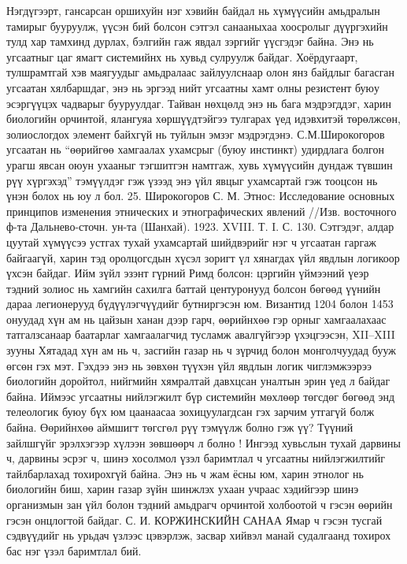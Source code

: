 Нэгдүгээрт, гансарсан оршихуйн нэг хэвийн байдал нь хүмүүсийн амьдралын тамирыг бууруулж, үүсэн бий болсон сэтгэл санааныхаа хоосролыг дүүргэхийн тулд хар тамхинд дурлах, бэлгийн гаж явдал зэргийг үүсгэдэг байна. Энэ нь угсаатныг цаг ямагт системийнх нь хувьд сулруулж байдаг. Хоёрдугаарт, тулшрамтгай хэв маягуудыг амьдралаас зайлуулснаар олон янз байдлыг багасган угсаатан хялбаршдаг, энэ нь эргээд нийт угсаатны хамт олны резистент буюу эсэргүүцэх чадварыг бууруулдаг. Тайван нөхцөлд энэ нь бага мэдрэгддэг, харин биологийн орчинтой, ялангуяа хөршүүдтэйгээ тулгарах үед идэвхитэй төрөлжсөн, золиослогдох элемент байхгүй нь туйлын эмзэг мэдрэгдэнэ. С.М.Широкогоров угсаатан нь “өөрийгөө хамгаалах ухамсрыг (буюу инстинкт) удирдлага болгон урагш явсан оюун ухааныг тэгшитгэн намтгаж, хувь хүмүүсийн дундаж түвшин рүү хүргэхэд” тэмүүлдэг гэж үзээд энэ үйл явцыг ухамсартай гэж тооцсон нь үнэн болох нь юу л бол. 25. Широкогоров С. М. Этнос: Исследование основных принципов изменения этнических и этнографических явлений //Изв. восточного ф-та Дальнево-сточн. ун-та (Шанхай). 1923. XVIII. Т. I. С. 130.
Сэтгэдэг, алдар цуутай хүмүүсээ устгах тухай ухамсартай шийдвэрийг нэг ч угсаатан гаргаж байгаагүй, харин тэд оролцогсдын хүсэл зоригт үл хянагдах үйл явдлын логикоор үхсэн байдаг. Ийм зүйл эзэнт гүрний Римд болсон: цэргийн үймээний үеэр тэдний золиос нь хамгийн сахилга баттай центуронууд болсон бөгөөд үүнийн дараа легионерууд бүдүүлэгчүүдийг бутниргэсэн юм. Византид 1204 болон 1453 онуудад хүн ам нь цайзын ханан дээр гарч, өөрийнхөө гэр орныг хамгаалахаас татгалзсанаар баатарлаг хамгаалагчид тусламж авалгүйгээр үхэцгээсэн, XII–XIII зууны Хятадад хүн ам нь ч, засгийн газар нь ч зүрчид болон монголчуудад бууж өгсөн гэх мэт. Гэхдээ энэ нь зөвхөн түүхэн үйл явдлын логик чиглэмжээрээ биологийн доройтол, нийгмийн хямралтай давхцсан уналтын эрин үед л байдаг байна. Иймээс угсаатны нийлэгжилт бүр системийн мөхлөөр төгсдөг бөгөөд энд телеологик буюу бүх юм цаанаасаа зохицуулагдсан гэх зарчим утгагүй болж байна. Өөрийнхөө аймшигт төгсгөл рүү тэмүүлж болно гэж үү? Түүний зайлшгүйг эрэлхэгээр хүлээн зөвшөөрч л болно ! Ингээд хувьслын тухай дарвины ч, дарвины эсрэг ч, шинэ хосолмол үзэл баримтлал ч угсаатны нийлэгжилтийг тайлбарлахад тохирохгүй байна. Энэ нь ч жам ёсны юм, харин этнолог нь биологийн биш, харин газар зүйн шинжлэх ухаан учраас хэдийгээр шинэ организмын зан үйл болон тэдний амьдрагч орчинтой холбоотой ч гэсэн өөрийн гэсэн онцлогтой байдаг.
С. И. КОРЖИНСКИЙН САНАА
Ямар ч гэсэн тусгай сэдвүүдийг нь урьдач үзлээс цэвэрлэж, засвар хийвэл манай судалгаанд тохирох бас нэг үзэл баримтлал бий.
